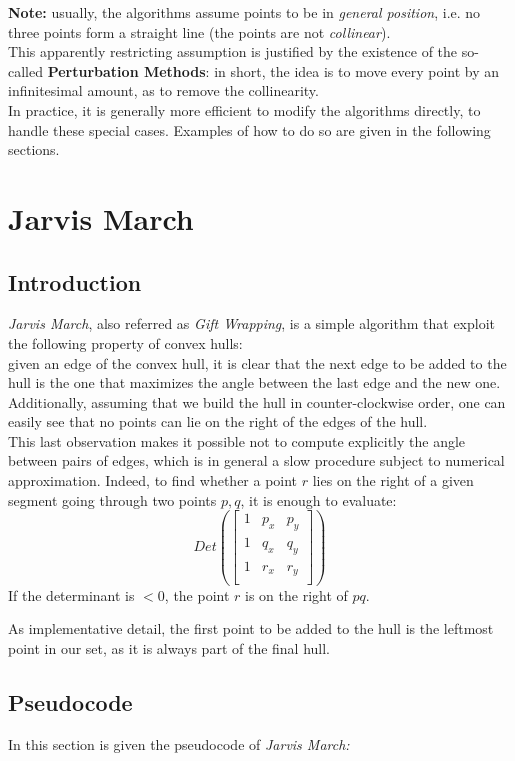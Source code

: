\documentclass[
12pt,
a4paper,
oneside,
headinclude,
footinclude]{report}
\theoremstyle{definition} %
\begin{document}
\textbf{Note:} usually, the algorithms assume points to be in \textit{general position}, i.e. no three points form a straight line (the points are not \textit{collinear}).\\
This apparently restricting assumption is justified by the existence of the so-called \textbf{Perturbation Methods}: in short, the idea is to move every point by an infinitesimal amount, as to remove the collinearity. \cite{Emiris:1991:EAR:894044}\\
In practice, it is generally more efficient to modify the algorithms directly, to handle these special cases. Examples of how to do so are given in the following sections.
\section{Jarvis March} 
\subsection{Introduction}
\textit{Jarvis March}, also referred as \textit{Gift Wrapping}, is a simple algorithm that exploit the following property of convex hulls:\\
given an edge of the convex hull, it is clear that the next edge to be added to the hull is the one that maximizes the angle between the last edge and the new one.\\

Additionally, assuming that we build the hull in counter-clockwise order, one can easily see that no points can lie on the right of the edges of the hull.\\
This last observation makes it possible not to compute explicitly the angle between pairs of edges, which is in general a slow procedure subject to numerical approximation.
Indeed, to find whether a point $r$ lies on the right of a given segment going through two points $p, q$, it is enough to evaluate:\\
\[
Det\left(
\begin{bmatrix}
1 & p_x & p_y \\
1 & q_x & q_y \\
1 & r_x & r_y \\
\end{bmatrix}\right )
\]
If the determinant is $< 0$, the point $r$ is on the right of $pq$.

As implementative detail, the first point to be added to the hull is the leftmost point in our set, as it is always part of the final hull.
\subsection{Pseudocode}
In this section is given the pseudocode of \textit{Jarvis March:} \cite{Preparata:1985:CGI:4333}\\
\end{document}
